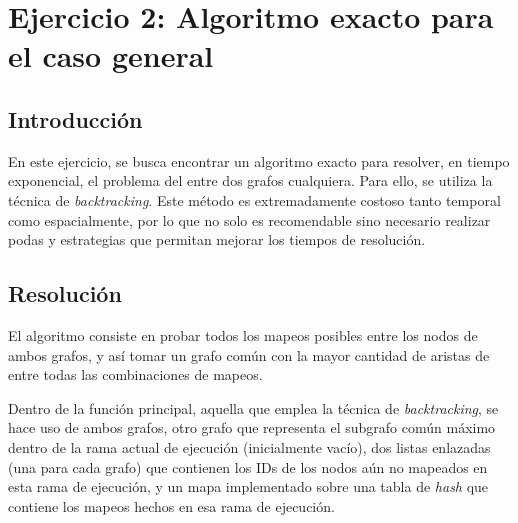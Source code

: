 \section{Ejercicio 2: Algoritmo exacto para el caso general}


\subsection{Introducción}
En este ejercicio, se busca encontrar un algoritmo exacto para resolver, en
tiempo exponencial, el problema del  entre dos grafos cualquiera.
Para ello, se utiliza la técnica de \textit{backtracking}. Este método es
extremadamente costoso tanto temporal como espacialmente, por lo que no solo
es recomendable sino necesario realizar podas y estrategias que
permitan mejorar los tiempos de resolución.

\subsection{Resolución}
El algoritmo consiste en probar todos los mapeos posibles entre los nodos de
ambos grafos, y así tomar un grafo común con la mayor cantidad de aristas de
entre todas las combinaciones de mapeos.

Dentro de la función principal, aquella que emplea la técnica de
\textit{backtracking}, se hace uso de ambos grafos, otro grafo que representa
el subgrafo común máximo dentro de la rama actual de ejecución (inicialmente
vacío), dos listas enlazadas (una para cada grafo) que contienen
los IDs de los nodos aún no mapeados en esta rama de ejecución, y un mapa
implementado sobre una tabla de \emph{hash} que contiene los mapeos hechos en esa
rama de ejecución.

\vspace{1em}

